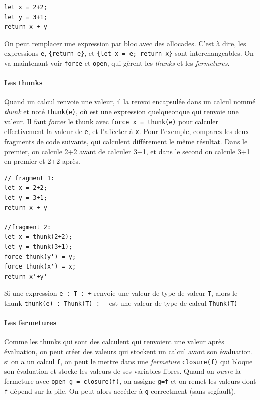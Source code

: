 \documentclass[12pt]{article}
\begin{document}
\begin{verbatim}
let x = 2+2;
let y = 3+1;
return x + y
\end{verbatim}

On peut remplacer une expression par bloc avec des allocades. C'est à
dire, les expressions \texttt{e}, \texttt{\{return\ e\}}, et
\texttt{\{let\ x\ =\ e;\ return\ x\}} sont interchangeables. On va
maintenant voir \texttt{force} et \texttt{open}, qui gèrent les
\emph{thunks} et les \emph{fermetures}.

\hypertarget{les-thunks}{%
      \paragraph*{Les thunks}\label{les-thunks}}

Quand un calcul renvoie une valeur, il la renvoi encapsulée dans un
calcul nommé \emph{thunk} et noté \texttt{thunk(e)}, où est une
expression quelqueonque qui renvoie une valeur. Il faut \emph{forcer} le
thunk avec \texttt{force\ x\ =\ thunk(e)} pour calculer effectivement la
valeur de \texttt{e}, et l'affecter à \texttt{x}. Pour l'exemple,
comparez les deux fragments de code suivants, qui calculent différement
le même résultat. Dans le premier, on calcule 2+2 avant de calculer 3+1,
et dans le second on calcule 3+1 en premier et 2+2 après.

\begin{verbatim}
// fragment 1:
let x = 2+2;
let y = 3+1;
return x + y 
  
//fragment 2:
let x = thunk(2+2);
let y = thunk(3+1);
force thunk(y') = y;
force thunk(x') = x;
return x'+y'
\end{verbatim}

Si une expression \texttt{e\ :\ T\ :\ +} renvoie une valeur de type de
valeur \texttt{T}, alors le thunk \texttt{thunk(e)\ :\ Thunk(T)\ :\ -}
est une valeur de type de calcul \texttt{Thunk(T)}

\hypertarget{les-fermetures}{%
      \paragraph*{Les fermetures}\label{les-fermetures}}

Comme les thunks qui sont des calculent qui renvoient une valeur après
évaluation, on peut créer des valeurs qui stockent un calcul avant son
évaluation. si on a un calcul \texttt{f}, on peut le mettre dans une
\emph{fermeture} \texttt{closure(f)} qui bloque son évaluation et stocke
les valeurs de ses variables libres. Quand on \emph{ouvre} la fermeture
avec \texttt{open\ g\ =\ closure(f)}, on assigne \texttt{g=f} et on
remet les valeurs dont \texttt{f} dépend sur la pile. On peut alors
accéder à \texttt{g} correctment (sans segfault).
\end{document}

